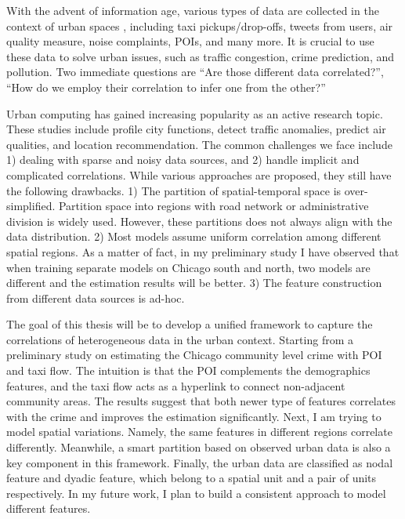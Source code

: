 With the advent of information age, various types of data are collected in the context of urban spaces , including taxi pickups/drop-offs, tweets from users, air quality measure, noise complaints, POIs, and many more. It is crucial to use these data to solve urban issues, such as traffic congestion, crime prediction, and pollution. Two immediate questions are ``Are those different data correlated?'', ``How do we employ their correlation to infer one from the other?''

Urban computing has gained increasing popularity as an active research topic. These studies include profile city functions, detect traffic anomalies, predict air qualities, and location recommendation. The common challenges we face include 1) dealing with sparse and noisy data sources, and 2) handle implicit and complicated correlations. While various approaches are proposed, they still have the following drawbacks. 1) The partition of spatial-temporal space is over-simplified. Partition space into regions with road network or administrative division is widely used. However, these partitions does not always align with the data distribution. 2) Most models assume uniform correlation among different spatial regions. As a matter of fact, in my preliminary study I have observed that when training separate models on Chicago south and north, two models are different and the estimation results will be better. 3) The feature construction from different data sources is ad-hoc.

The goal of this thesis will be to develop a unified framework to capture the correlations of heterogeneous data in the urban context. Starting from a preliminary study on estimating the Chicago community level crime with POI and taxi flow. The intuition is that the POI complements the demographics features, and the taxi flow acts as a hyperlink to connect non-adjacent community areas. The results suggest that both newer type of features correlates with the crime and improves the estimation significantly. Next, I am trying to model spatial variations. Namely, the same features in different regions correlate differently. Meanwhile, a smart partition based on observed urban data is also a key component in this framework. Finally, the urban data are classified as nodal feature and dyadic feature, which belong to a spatial unit and a pair of units respectively. In my future work, I plan to build a consistent approach to model different features.
